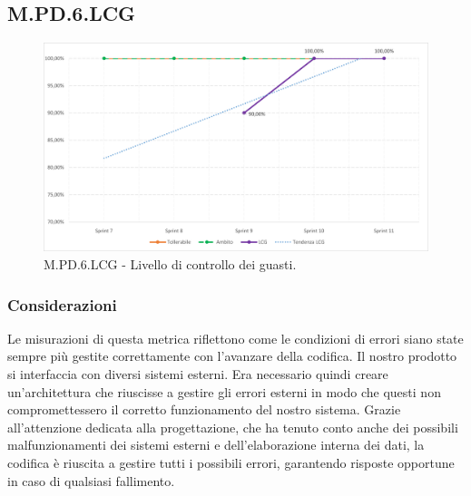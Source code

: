 \documentclass[10pt, a4paper]{article}
\begin{document}
\subsection{M.PD.6.LCG}
\begin{figure}[H] \includegraphics[width=15.5cm]{img/metriche/MPD6LCG.png} \caption{M.PD.6.LCG - Livello di controllo dei guasti.} \end{figure}
\subsubsection{Considerazioni}
Le misurazioni di questa metrica riflettono come le condizioni di errori siano state sempre più gestite correttamente con l'avanzare della codifica. Il nostro prodotto si interfaccia con diversi sistemi esterni. Era necessario quindi creare un'architettura che riuscisse a gestire gli errori esterni in modo che questi non compromettessero il corretto funzionamento del nostro sistema. Grazie all'attenzione dedicata alla progettazione, che ha tenuto conto anche dei possibili malfunzionamenti dei sistemi esterni e dell'elaborazione interna dei dati, la codifica è riuscita a gestire tutti i possibili errori, garantendo risposte opportune in caso di qualsiasi fallimento.
\end{document}
